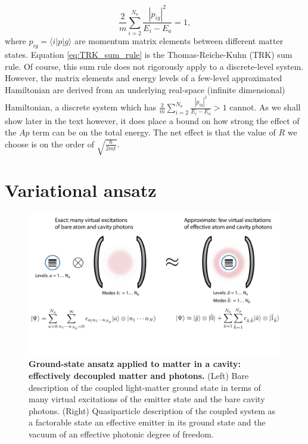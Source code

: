 \documentclass[aps,prb,twocolumn,
	groupedaddress,superscriptaddress,
	amsfonts,amssymb,amsmath,floatfix,
	citeautoscript]{revtex4-1}
\begin{document}
\begin{equation}\label{eq:TRK_sum_rule}
\frac{2}{m}\sum\limits_{i=2}^{N_a}\frac{|p_{ig}|^2}{E_i - E_a} = 1,
\end{equation}
where $p_{ig} = \langle i|p|g\rangle$ are momentum matrix elements between different matter states. Equation \ref{eq:TRK_sum_rule} is the Thomas-Reiche-Kuhn (TRK) sum rule. Of course, this sum rule does not rigorously apply to a discrete-level system. However, the matrix elements and energy levels of a few-level approximated Hamiltonian  are derived from an underlying real-space (infinite dimensional) Hamiltonian, a discrete system which has  $\frac{2}{m}\sum\limits_{i=2}^{N_a}\frac{|p_{ig}|^2}{E_i - E_a} > 1$ cannot. As we shall show later in the text however, it does place a bound on how strong the effect of the $Ap$ term can be on the total energy. The net effect is that the value of $R$ we choose is on the order of $\sqrt{\frac{\hbar}{2mt}}$.

\section{Variational ansatz}
\label{sec:variational_ansatz}
\begin{figure}[t]
\includegraphics[width=16cm]{conceptfigure.pdf}
\caption{\textbf{Ground-state ansatz applied to matter in a cavity: effectively decoupled matter and photons.} (Left) Bare description of the coupled light-matter ground state in terms of many virtual excitations of the emitter state and the bare cavity photons. (Right) Quasiparticle description of the coupled system as a factorable state an effective emitter in its ground state and the vacuum of an effective photonic degree of freedom.}
\label{fig:ansatz}
\end{figure}
\end{document}
